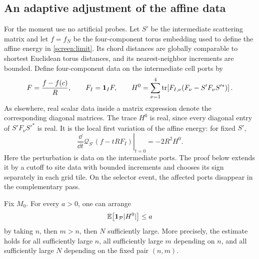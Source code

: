 \subsection{An adaptive adjustment of the affine data}

For the moment use no artificial probes. Let $S'$ be the intermediate
scattering matrix and let $f=f_N$ be the four-component torus embedding
used to define the affine energy in \cref{screen:limit}. Its chord
distances are globally comparable to shortest Euclidean torus
distances, and its nearest-neighbor increments are bounded. Define
four-component data on the intermediate cell ports by
\begin{equation}\label{van:trace-data}
 F=\frac{f-f(c)}{R},\qquad F_I=\mathbf 1_I F,
 \qquad
 H^0=\sum_{\nu=1}^{4}
 \operatorname{tr}\!\left[F_{I,\nu}(F_\nu-S'F_\nu S'^*)\right].
\end{equation}
As elsewhere, real scalar data inside a matrix expression denote the
corresponding diagonal matrices. The trace $H^0$ is real, since every
diagonal entry of $S'F_\nu S'^*$ is real.
It is the local first variation of the affine energy: for fixed $S'$,
\[
 \left.\frac{\dd}{\dd t}\mathcal Q_{S'}(f-tRF_I)\right|_{t=0}
       =-2R^2H^0.
\]
Here the perturbation is data on the intermediate ports. The proof below
extends it by a cutoff to site data with bounded increments and chooses
its sign separately in each grid tile. On the selector event, the
affected ports disappear in the complementary pass.

\begin{lemma}\label{van:adjustment}
Fix $M_0$. For every $a>0$, one can arrange
\begin{equation}\label{van:adjustment-small}
 \mathbb E\bigl[\mathbf 1_{\mathcal P}|H^0|\bigr]\leq a
\end{equation}
by taking $n$, then $m>n$, then $N$ sufficiently large. More precisely,
the estimate holds for all sufficiently large $n$, all sufficiently
large $m$ depending on $n$, and all sufficiently large $N$ depending on
the fixed pair $(n,m)$.
\end{lemma}

